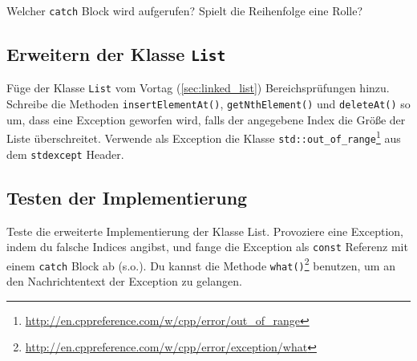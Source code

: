 
Welcher \lstinline{catch} Block wird aufgerufen?
Spielt die Reihenfolge eine Rolle?

\subsection{Erweitern der Klasse \lstinline{List}}
\label{subsec:list_exceptions}
Füge der Klasse \lstinline{List} vom Vortag (\ref{sec:linked_list}) Bereichsprüfungen hinzu.
Schreibe die Methoden \mbox{\lstinline{insertElementAt()}}, \lstinline{getNthElement()} und \lstinline{deleteAt()} so um, dass eine Exception geworfen wird, falls der angegebene Index die Größe der Liste überschreitet.
Verwende als Exception die Klasse \lstinline{std::out_of_range}\footnote{\url{http://en.cppreference.com/w/cpp/error/out_of_range}} aus dem \lstinline{stdexcept} Header.


\subsection{Testen der Implementierung}
Teste die erweiterte Implementierung der Klasse List.
Provoziere eine Exception, indem du falsche Indices angibst, und fange die Exception als \lstinline{const} Referenz mit einem \lstinline{catch} Block ab (s.o.).
Du kannst die Methode \lstinline{what()}\footnote{\url{http://en.cppreference.com/w/cpp/error/exception/what}} benutzen, um an den Nachrichtentext der Exception zu gelangen.
